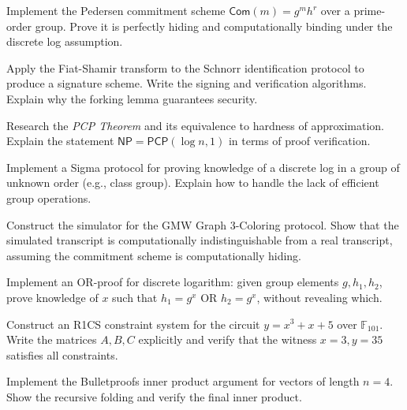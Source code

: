 \begin{exercise}[Basic]
Implement the Pedersen commitment scheme $\mathsf{Com}(m) = g^m h^r$ over a prime-order group. Prove it is perfectly hiding and computationally binding under the discrete log assumption.
\end{exercise}

\begin{exercise}[Basic]
Apply the Fiat-Shamir transform to the Schnorr identification protocol to produce a signature scheme. Write the signing and verification algorithms. Explain why the forking lemma guarantees security.
\end{exercise}

\begin{exercise}[Intermediate]
Research the \emph{PCP Theorem} and its equivalence to hardness of approximation. Explain the statement $\mathsf{NP} = \mathsf{PCP}(\log n, 1)$ in terms of proof verification.
\end{exercise}

\begin{exercise}[Intermediate]
Implement a Sigma protocol for proving knowledge of a discrete log in a group of unknown order (e.g., class group). Explain how to handle the lack of efficient group operations.
\end{exercise}

\begin{exercise}[Intermediate]
Construct the simulator for the GMW Graph 3-Coloring protocol. Show that the simulated transcript is computationally indistinguishable from a real transcript, assuming the commitment scheme is computationally hiding.
\end{exercise}

\begin{exercise}[Intermediate]
Implement an OR-proof for discrete logarithm: given group elements $g, h_1, h_2$, prove knowledge of $x$ such that $h_1 = g^x$ OR $h_2 = g^x$, without revealing which.
\end{exercise}

\begin{exercise}[Intermediate]
Construct an R1CS constraint system for the circuit $y = x^3 + x + 5$ over $\mathbb{F}_{101}$. Write the matrices $A, B, C$ explicitly and verify that the witness $x=3, y=35$ satisfies all constraints.
\end{exercise}

\begin{exercise}[Intermediate]
Implement the Bulletproofs inner product argument for vectors of length $n=4$. Show the recursive folding and verify the final inner product.
\end{exercise}

